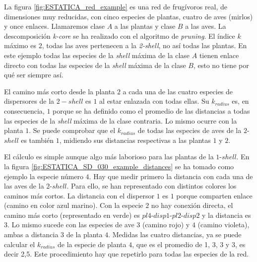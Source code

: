%

La figura \ref{fig:ESTATICA_red_example} es una red de frugívoros real, de dimensiones muy reducidas, con cinco especies de plantas, cuatro de aves (mirlos) y once enlaces. Llamaremos clase $A$ a las plantas y clase $B$ a las aves. La descomposición \textit{k-core} se ha realizado con el algoritmo de \textit{pruning}. El índice $k$ máximo es $2$, todas las aves pertenecen a la \textit{2-shell}, no así todas las plantas. En este ejemplo todas las especies de la \textit{shell} máxima de la clase $A$ tienen enlace directo con todas las especies de la \textit{shell} máxima de la clase $B$, esto no tiene por qué ser siempre así. 

El camino más corto desde la planta $2$ a cada una de las cuatro especies de dispersores de la $2-shell$ es $1$ al estar enlazada con todas ellas. Su $k_{radius}$ es, en consecuencia, $1$ porque se ha definido como el promedio de las distancias a todas las especies de la \textit{shell} máxima de la clase contraria. Lo mismo ocurre con la planta $1$. Se puede comprobar que el $k_{radius}$ de todas las especies de aves de la $2$-$shell$ es también $1$, midiendo sus distancias respectivas a las plantas $1$ y $2$.

El cálculo es simple aunque algo más laborioso para las plantas de la $1$-$shell$. En la figura \ref{fig:ESTATICA_SD_030_example_distances} se ha tomado como ejemplo la especie número $4$. Hay que medir primero la distancia con cada una de las aves de la $2$-$shell$. Para ello, se han representado con distintos colores los caminos más cortos. La distancia con el dispersor $1$ es $1$ porque comparten enlace (camino en color azul marino). Con la especie $2$ no hay conexión directa, el camino más corto (representado en verde) es $pl4$-$disp1$-$pl2$-$disp2$ y la distancia es $3$. Lo mismo sucede con las especies de ave $3$ (camino rojo) y $4$ (camino violeta), ambas a distancia $3$ de la planta $4$. Medidas las cuatro distancias, ya se puede calcular el $k_{radius}$ de la especie de planta $4$, que es el promedio de 1, 3, 3 y 3, es decir 2,5. Este procedimiento hay que repetirlo para todas las especies de la red.

